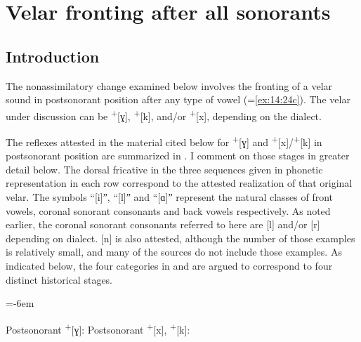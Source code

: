 \section{{Velar} {fronting} {after} {all} {sonorants}}\label{sec:14.4}

\subsection{Introduction}\label{sec:14.4.1}

The nonassimilatory change examined below involves the fronting of a  velar sound in postsonorant position after any type of vowel (=\ref{ex:14:24c}). The velar under discussion can be  \textsuperscript{+}[ɣ],\textsuperscript{ +}[k], and/or \textsuperscript{+}[x], depending on the dialect.

The reflexes attested in the material cited below for  \textsuperscript{+}[ɣ] and \textsuperscript{+}[x]/\textsuperscript{+}[k] in postsonorant position are summarized in . I comment on those stages in greater detail below. The dorsal fricative in the three sequences given in phonetic representation in each row correspond to the attested realization of that original velar. The symbols “[i]ˮ, “[l]ˮ and “[ɑ]ˮ represent the natural classes of front vowels, coronal sonorant consonants and back vowels respectively. As noted earlier, the coronal sonorant consonants referred to here are [l] and/or [r] depending on dialect. [n] is also attested, although the number of those examples is relatively small, and many of the sources do not include those examples. As indicated below, the four categories in  and  are argued to correspond to four distinct historical stages.

\ea%
\settowidth{}
\columnsep=-6em\label{ex:14:32}\begin{multicols}{2}\raggedcolumns
\ea Postsonorant \textsuperscript{+}[ɣ]:\label{ex:14:32a}
\ea {} 
\ex {}
\ex {}
\ex {}
\z
\ex Postsonorant \textsuperscript{+}[x], \textsuperscript{+}[k]:\label{ex:14:32b}
\ea {}  
\ex {}  
\ex {}  
\ex {}  
\z
\z 
\end{multicols}
\z 

